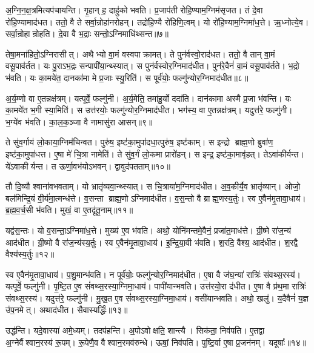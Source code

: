 अ॒ग्नि॒न॒क्ष॒त्रमित्यप॑चायन्ति।
गृ॒हान् ह॒ दाहु॑को भवति।
प्र॒जाप॑ती रोहि॒ण्याम॒ग्निम॑सृजत।
तं दे॒वा रो॑हि॒ण्यामाद॑धत।
ततो॒ वै ते सर्वा॒न्रोहा॑नरोहन्।
तद्रो॑हि॒ण्यै रो॑हिणि॒त्वम्।
यो रो॑हि॒ण्याम॒ग्निमा॑ध॒त्ते।
ऋ॒ध्नोत्ये॒व।
सर्वा॒न्रोहान्रोहति।
दे॒वा वै भ॒द्राः सन्तो॒\-ऽग्निमाधि॑थ्सन्त॥७॥

तेषा॒मना॑हितो॒\-ऽग्निरासीत्।
अथैभ्यो वा॒मं वस्वपाक्रामत्।
ते पुन॑र्वस्वो॒राद॑धत।
ततो॒ वै तान् वा॒मं वसू॒पाव॑र्तत।
यः पु॒राऽभ॒द्रः सन्पापी॑या॒न्थ्स्यात्।
स पुन॑र्वस्वोर॒ग्निमाद॑धीत।
पुन॑रे॒वैनं॑ वा॒मं वसू॒पाव॑र्तते।
भ॒द्रो भ॑वति।
यः का॒मये॑त॒ दानका॑मा मे प्र॒जाः स्यु॒रिति॑।
स पूर्व॑योः॒ फल्गु॑न्योर॒ग्निमाद॑धीत॥८॥

अ॒र्य॒म्णो वा ए॒तन्नक्ष॑त्रम्।
यत्पूर्वे॒ फल्गु॑नी।
अ॒र्य॒मेति॒ तमा॑हु॒र्यो ददा॑ति।
दान॑कामा अस्मै प्र॒जा भ॑वन्ति।
यः का॒मये॑त भ॒गी स्या॒मिति॑।
स उत्त॑रयोः॒ फल्गु॑न्योर॒ग्निमाद॑धीत।
भग॑स्य॒ वा ए॒तन्नक्ष॑त्रम्।
यदुत्त॑रे॒ फल्गु॑नी।
भ॒ग्ये॑व भ॑वति।
का॒ल॒क॒ञ्जा वै नामासु॑रा आसन्॥९॥

ते सु॑व॒र्गाय॑ लो॒काया॒ग्निम॑चिन्वत।
पुरु॑ष॒ इष्ट॑का॒मुपा॑दधा॒त्\-पुरु॑ष॒ इष्ट॑काम्।
स इन्द्रो ब्राह्म॒णो ब्रुवा॑ण॒ इष्ट॑का॒मुपा॑धत्त।
ए॒षा मे॑ चि॒त्रा नामेति॑।
ते सु॑व॒र्गं लो॒कमा प्रारो॑हन्।
स इन्द्र॒ इष्ट॑का॒मावृ॑हत्।
तेऽवा॑कीर्यन्त।
ये॑ऽवाकीर्यन्त।
त ऊर्णा॒वभ॑यो\-ऽभवन्।
द्वावुद॑पतताम्॥१०॥

तौ दि॒व्यौ श्वाना॑वभवताम्।
यो भ्रातृ॑व्यवा॒न्थ्स्यात्।
स चि॒त्राया॑म॒ग्निमाद॑धीत।
अ॒व॒कीर्यै॒व भ्रातृ॑व्यान्।
ओजो॒ बल॑मिन्द्रि॒यं वी॒र्य॑मा॒त्मन्ध॑त्ते।
व॒सन्ता ब्राह्म॒णो\-ऽग्निमाद॑धीत।
व॒स॒न्तो वै ब्राह्म॒णस्य॒र्तुः।
स्व ए॒वैन॑मृ॒तावा॒धाय॑।
ब्र॒ह्म॒व॒र्च॒सी भ॑वति।
मुखं॒ वा ए॒तदृ॑तू॒नाम्॥११॥

यद्व॑स॒न्तः।
यो व॒सन्ता॒\-ऽग्निमा॑ध॒त्ते।
मुख्य॑ ए॒व भ॑वति।
अथो॒ योनि॑मन्तमे॒वैनं॒ प्रजा॑त॒माध॑त्ते।
ग्री॒ष्मे रा॑ज॒न्य॑ आद॑धीत।
ग्री॒ष्मो वै रा॑ज॒न्य॑स्य॒र्तुः।
स्व ए॒वैन॑मृ॒तावा॒धाय॑।
इ॒न्द्रि॒या॒वी भ॑वति।
श॒रदि॒ वैश्य॒ आद॑धीत।
श॒रद्वै वैश्य॑स्य॒र्तुः॥१२॥

स्व ए॒वैन॑मृ॒तावा॒धाय॑।
प॒शु॒मान्भ॑वति।
न पूर्व॑योः॒ फल्गु॑न्योर॒ग्निमाद॑धीत।
ए॒षा वै ज॑घ॒न्या॑ रात्रिः॑ संवथ्स॒रस्य॑।
यत्पूर्वे॒ फल्गु॑नी।
पृ॒ष्टि॒त ए॒व सं॑वथ्स॒रस्या॒ग्निमा॒धाय॑।
पापी॑यान्भवति।
उत्त॑रयो॒रा द॑धीत।
ए॒षा वै प्र॑थ॒मा रात्रिः॑ संवथ्स॒रस्य॑।
यदुत्त॑रे॒ फल्गु॑नी।
मु॒ख॒त ए॒व सं॑वथ्स॒रस्या॒ग्निमा॒धाय॑।
वसी॑यान्भवति।
अथो॒ खलु॑।
य॒दैवैनं॑ य॒ज्ञ उ॑प॒नमेत्।
अथाद॑धीत।
सैवास्यर्द्धिः॑॥१३॥\anuvakamend[खल्वा॑धिथ्सन्त॒ फल्गु॑न्योर॒ग्निमाद॑धीतासन्नपततामृतू॒नां वैश्य॑स्य॒र्तुरुत्त॑रे॒ फल्गु॑नी॒ षट्च॑]

उद्ध॑न्ति।
यदे॒वास्या॑ अमे॒ध्यम्।
तदप॑हन्ति।
अ॒पोऽवोक्षति॒ शान्त्यै।
सिक॑ता॒ निव॑पति।
ए॒तद्वा अ॒ग्नेर्वैश्वान॒रस्य॑ रू॒पम्।
रू॒पेणै॒व वैश्वान॒रमव॑रुन्धे।
ऊषां॒ निव॑पति।
पुष्टि॒र्वा ए॒षा प्र॒जन॑नम्।
यदूषाः᳚॥१४॥

